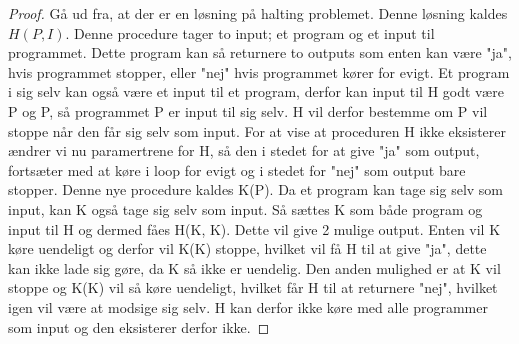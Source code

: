 \begin{proof}
Gå ud fra, at der er en løsning på halting problemet. Denne løsning kaldes $H(P, I)$. Denne procedure tager to input; et program og et input til programmet. Dette program kan så returnere to outputs som enten kan være "ja", hvis programmet stopper, eller "nej" hvis programmet kører for evigt. Et program i sig selv kan også være et input til et program, derfor kan input til H godt være P og P, så programmet P er input til sig selv.
H vil derfor bestemme om P vil stoppe når den får sig selv som input.
For at vise at proceduren H ikke eksisterer ændrer vi nu paramertrene for H, så den i stedet for at give "ja" som output, fortsæter med at køre i loop for evigt og i stedet for "nej" som output bare stopper.
Denne nye procedure kaldes K(P).
Da et program kan tage sig selv som input, kan K også tage sig selv som input. 
Så sættes K som både program og input til H og dermed fåes H(K, K).
Dette vil give 2 mulige output. 
Enten vil K køre uendeligt og derfor vil K(K) stoppe, hvilket vil få H til at give "ja", dette kan ikke lade sig gøre, da K så ikke er uendelig.
Den anden mulighed er at K vil stoppe og K(K) vil så køre uendeligt, hvilket får H til at returnere "nej", hvilket igen vil være at modsige sig selv. 
H kan derfor ikke køre med alle programmer som input og den eksisterer derfor ikke.
\end{proof}

